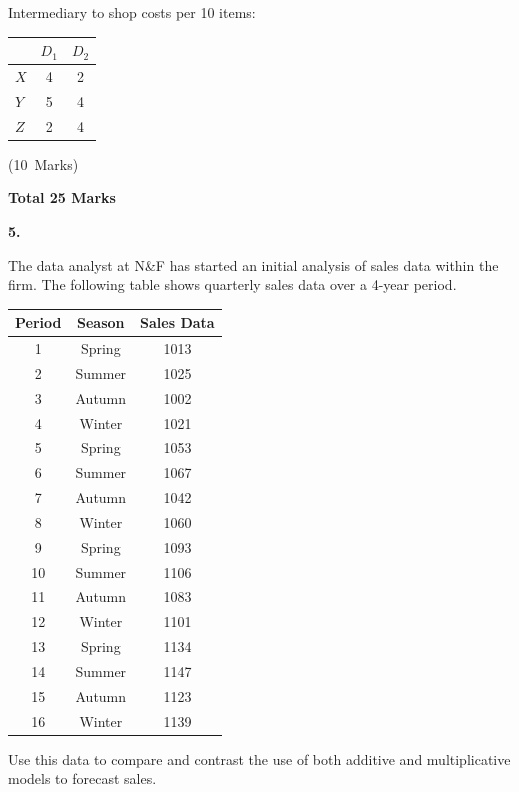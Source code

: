 \documentclass[11pt,a4paper]{article}
\newcommand{\markalloc}[1]{\nobreak\hfill\mbox{(#1 Marks)}}
\newcommand{\questiontotal}[1]{\begin{flushright}\textbf{Total #1 Marks}\end{flushright}}
\begin{document}
\begin{enumerate}
Intermediary to shop costs per 10 items:

\begin{center}
\begin{tabular}{lcc}
\toprule
 & $D_1$ & $D_2$ \\
\midrule
$X$ & 4 & 2 \\
$Y$ & 5 & 4 \\
$Z$ & 2 & 4 \\
\bottomrule
\end{tabular}
\end{center}

\markalloc{10}
\end{enumerate}

\questiontotal{25}

\newpage

\textbf{5.}

The data analyst at N\&F has started an initial analysis of sales data within the firm.
The following table shows quarterly sales data over a 4-year period.

\begin{center}
\begin{tabular}{ccc}
\toprule
Period & Season & Sales Data \\
\midrule
1 & Spring & 1013 \\
2 & Summer & 1025 \\
3 & Autumn & 1002 \\
4 & Winter & 1021 \\
5 & Spring & 1053 \\
6 & Summer & 1067 \\
7 & Autumn & 1042 \\
8 & Winter & 1060 \\
9 & Spring & 1093 \\
10 & Summer & 1106 \\
11 & Autumn & 1083 \\
12 & Winter & 1101 \\
13 & Spring & 1134 \\
14 & Summer & 1147 \\
15 & Autumn & 1123 \\
16 & Winter & 1139 \\
\bottomrule
\end{tabular}
\end{center}

Use this data to compare and contrast the use of both additive and multiplicative models to forecast sales.
\end{document}

